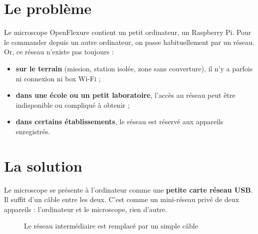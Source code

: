 \documentclass[11pt,a4paper,openany]{report}
\begin{document}
\section{Le problème}
Le microscope OpenFlexure contient un petit ordinateur, un Raspberry Pi. Pour le commander depuis un autre ordinateur, on passe habituellement par un réseau. Or, ce réseau n'existe pas toujours :
\begin{itemize}
  \item \textbf{sur le terrain} (mission, station isolée, zone sans couverture), il n'y a parfois ni connexion ni box Wi-Fi ;
  \item \textbf{dans une école ou un petit laboratoire}, l'accès au réseau peut être indisponible ou compliqué à obtenir ;
  \item \textbf{dans certains établissements}, le réseau est réservé aux appareils enregistrés.
\end{itemize}

\section{La solution}
Le microscope se présente à l'ordinateur comme une \textbf{petite carte réseau USB}. Il suffit d'un câble entre les deux. C'est comme un mini-réseau privé de deux appareils : l'ordinateur et le microscope, rien d'autre.

\begin{figure}[H]
\centering
{}
\caption{Le réseau intermédiaire est remplacé par un simple câble}
\end{figure}
\end{document}
